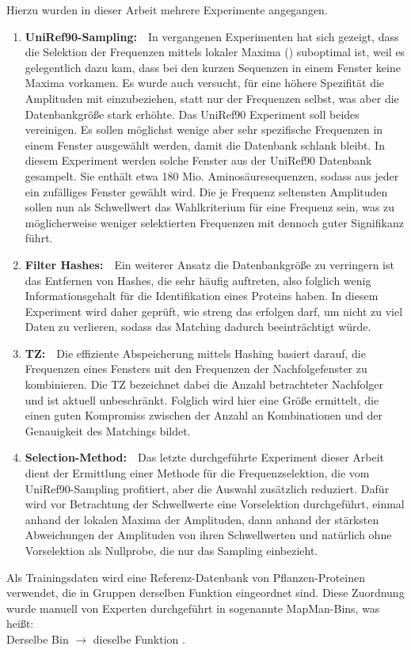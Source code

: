     Hierzu wurden in dieser Arbeit mehrere Experimente angegangen.
    \begin{enumerate}
        \item \textbf{UniRef90-Sampling:}\ \ In vergangenen Experimenten hat sich gezeigt, dass die Selektion der Frequenzen mittels lokaler Maxima () suboptimal ist, weil es gelegentlich dazu kam, dass bei den kurzen Sequenzen in einem Fenster keine Maxima vorkamen. Es wurde auch versucht, für eine höhere Spezifität die Amplituden mit einzubeziehen, statt nur der Frequenzen selbst, was aber die Datenbankgröße stark erhöhte. Das UniRef90 Experiment soll beides vereinigen. Es sollen möglichst wenige aber sehr spezifische Frequenzen in einem Fenster ausgewählt werden, damit die Datenbank schlank bleibt. In diesem Experiment werden solche Fenster aus der UniRef90 Datenbank gesampelt. Sie enthält etwa 180 Mio. Aminosäuresequenzen, sodass aus jeder ein zufälliges Fenster gewählt wird. Die je Frequenz seltensten Amplituden sollen nun als Schwellwert das Wahlkriterium für eine Frequenz sein, was zu möglicherweise weniger selektierten Frequenzen mit dennoch guter Signifikanz führt.
        \item \textbf{Filter Hashes:}\ \ Ein weiterer Ansatz die Datenbankgröße zu verringern ist das Entfernen von Hashes, die sehr häufig auftreten, also folglich wenig Informationsgehalt für die Identifikation eines Proteins haben. In diesem Experiment wird daher geprüft, wie streng das erfolgen darf, um nicht zu viel Daten zu verlieren, sodass das Matching dadurch beeinträchtigt würde. 
        \item \textbf{\acl{TZ}:}\ \ Die effiziente Abspeicherung mittels Hashing basiert darauf, die Frequenzen eines Fensters mit den Frequenzen der Nachfolgefenster zu kombinieren. Die \acl{TZ} bezeichnet dabei die Anzahl betrachteter Nachfolger und ist aktuell unbeschränkt. Folglich wird hier eine Größe ermittelt, die einen guten Kompromiss zwischen der Anzahl an Kombinationen und der Genauigkeit des Matchings bildet.
        \item \textbf{Selection-Method:}\ \ Das letzte durchgeführte Experiment dieser Arbeit dient der Ermittlung einer Methode für die Frequenzselektion, die vom UniRef90-Sampling profitiert, aber die Auswahl zusätzlich reduziert. Dafür wird vor Betrachtung der Schwellwerte eine Vorselektion durchgeführt, einmal anhand der lokalen Maxima der Amplituden, dann anhand der stärksten Abweichungen der Amplituden von ihren Schwellwerten und natürlich ohne Vorselektion als Nullprobe, die nur das Sampling einbezieht.
    \end{enumerate}
    Als Trainingsdaten wird eine Referenz-Datenbank von Pflanzen-Proteinen verwendet, die in Gruppen derselben Funktion eingeordnet sind. Diese Zuordnung wurde manuell von Experten durchgeführt in sogenannte MapMan-Bins, was heißt:\\Derselbe Bin $\rightarrow$ dieselbe Funktion \autocite{mapman}\autocite{mercator}.
